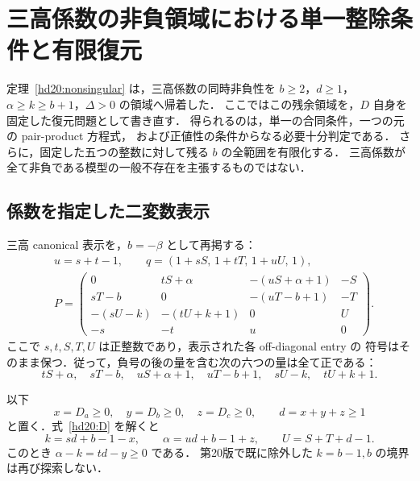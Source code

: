 \section{三高係数の非負領域における単一整除条件と有限復元}
\label{hd21:section}

定理~\ref{hd20:nonsingular} は，三高係数の同時非負性を
$b\ge2$，$d\ge1$，$\alpha\ge k\ge b+1$，$\Delta>0$ の領域へ帰着した．
ここではこの残余領域を，$D$ 自身を固定した復元問題として書き直す．
得られるのは，単一の合同条件，一つの元の pair-product 方程式，
および正値性の条件からなる必要十分判定である．
さらに，固定した五つの整数に対して残る $b$ の全範囲を有限化する．
三高係数が全て非負である模型の一般不存在を主張するものではない．

\subsection{係数を指定した二変数表示}

三高 canonical 表示を，$b=-\beta$ として再掲する：
\begin{equation}\label{hd21:canonical}
\begin{split}
 &u=s+t-1,\qquad
 q=(1+sS,\,1+tT,\,1+uU,\,1),\\
 &P=\begin{pmatrix}
 0&tS+\alpha&-(uS+\alpha+1)&-S\\
 sT-b&0&-(uT-b+1)&-T\\
 -(sU-k)&-(tU+k+1)&0&U\\
 -s&-t&u&0
 \end{pmatrix}.
\end{split}
\end{equation}
ここで $s,t,S,T,U$ は正整数であり，表示された各 off-diagonal entry の
符号はそのまま保つ．従って，負号の後の量を含む次の六つの量は全て正である：
\begin{equation}\label{hd21:sign-factors}
 tS+\alpha,\quad sT-b,\quad
 uS+\alpha+1,\quad uT-b+1,\quad
 sU-k,\quad tU+k+1.
\end{equation}

以下
\begin{equation}\label{hd21:D-data}
 x=D_a\ge0,\quad y=D_b\ge0,\quad z=D_c\ge0,
 \qquad d=x+y+z\ge1
\end{equation}
と置く．式~\eqref{hd20:D} を解くと
\begin{equation}\label{hd21:ak}
 k=sd+b-1-x,\qquad
 \alpha=ud+b-1+z,\qquad U=S+T+d-1.
\end{equation}
このとき $\alpha-k=td-y\ge0$ である．
第20版で既に除外した $k=b-1,b$ の境界は再び探索しない．

